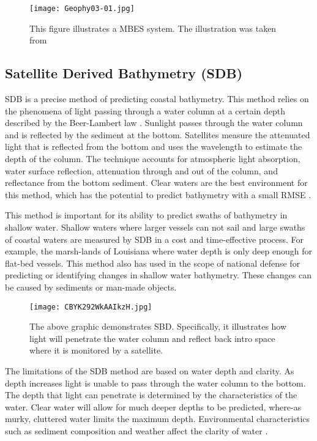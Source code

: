 \begin{figure}[h]
    \centering
    \texttt{[image: Geophy03-01.jpg]}
    \caption{This figure illustrates a \ac{MBES} system. The illustration was taken from \cite{monacoWeb}}
    \label{fig:MBES}
\end{figure}



\subsection{Satellite Derived Bathymetry (SDB)}
\ac{SDB} is a precise method of predicting coastal bathymetry. 
This method relies on the phenomena of light passing through a water column at a certain depth described by the Beer-Lambert law \cite{chybicki2018three}\cite{vinayaraj2016satellite}.
Sunlight passes through the water column and is reflected by the sediment at the bottom.
Satellites measure the attenuated light that is reflected from the bottom and uses the wavelength to estimate the depth of the column.
The technique accounts for atmospheric light absorption, water surface reflection, attenuation through and out of the column, and reflectance from the bottom sediment.
Clear waters are the best environment for this method, which has the potential to predict bathymetry with a small RMSE \cite{chybicki2018three}.

\par
This method is important for its ability to predict swaths of bathymetry in shallow water.
Shallow waters where larger vessels can not sail and large swaths of coastal waters are measured by \ac{SDB} in a cost and time-effective process.
For example, the marsh-lands of Louisiana where water depth is only deep enough for flat-bed vessels.
This method also has used in the scope of national defense for predicting or identifying changes in shallow water bathymetry.
These changes can be caused by sediments or man-made objects. 

\begin{figure}[h]
    \centering
    \texttt{[image: CBYK292WkAAIkzH.jpg]}
    \caption{The above graphic demonstrates \ac{SBD}.
    Specifically, it illustrates how light will penetrate the water column and reflect back intro space where it is monitored by a satellite.}
    \label{fig:sdb}
\end{figure}

\par
The limitations of the \ac{SDB} method are based on water depth and clarity.
As depth increases light is unable to pass through the water column to the bottom.
The depth that light can penetrate is determined by the characteristics of the water.
Clear water will allow for much deeper depths to be predicted, where-as murky, cluttered water limits the maximum depth.
Environmental characteristics such as sediment composition and weather affect the clarity of water \cite{vinayaraj2016satellite}.

